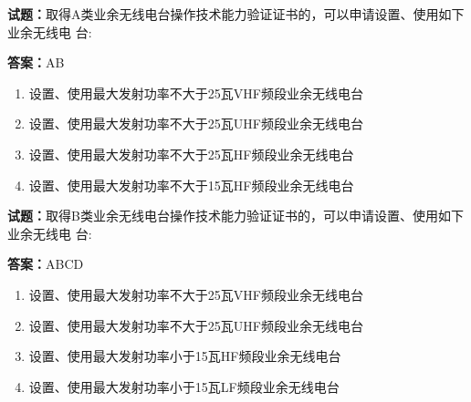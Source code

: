 \documentclass{ctexbook}
\begin{document}




\vspace{1em}

\textbf{试题：}取得A类业余无线电台操作技术能力验证证书的，可以申请设置、使用如下业余无线电
台: 

\textbf{答案：}AB 

\begin{enumerate}[leftmargin=3em]
  \item 设置、使用最大发射功率不大于25瓦VHF频段业余无线电台 

  \item 设置、使用最大发射功率不大于25瓦UHF频段业余无线电台 

  \item 设置、使用最大发射功率不大于25瓦HF频段业余无线电台 

  \item 设置、使用最大发射功率不大于15瓦HF频段业余无线电台 

\end{enumerate}






\vspace{1em}

\textbf{试题：}取得B类业余无线电台操作技术能力验证证书的，可以申请设置、使用如下业余无线电
台: 

\textbf{答案：}ABCD 

\begin{enumerate}[leftmargin=3em]
  \item 设置、使用最大发射功率不大于25瓦VHF频段业余无线电台 

  \item 设置、使用最大发射功率不大于25瓦UHF频段业余无线电台 

  \item 设置、使用最大发射功率小于15瓦HF频段业余无线电台 

  \item 设置、使用最大发射功率小于15瓦LF频段业余无线电台 

\end{enumerate}





\vspace{1em}
\end{document}
